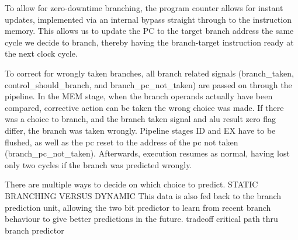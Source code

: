 To allow for zero-downtime branching, the program counter allows for instant updates, implemented via an internal bypass straight through to the instruction memory.
This allows us to update the PC to the target branch address the same cycle we decide to branch, thereby having the branch-target instruction ready at the next clock cycle.

To correct for wrongly taken branches, all branch related signals (branch\_taken, control\_should\_branch, and branch\_pc\_not\_taken) are passed on through the pipeline.
In the MEM stage, when the branch operands actually have been compared, corrective action can be taken the wrong choice was made. If there was a choice to branch, and the branch taken signal and alu result zero flag differ, the branch was taken wrongly.
Pipeline stages ID and EX have to be flushed, as well as the pc reset to the address of the pc not taken (branch\_pc\_not\_taken).
Afterwards, execution resumes as normal, having lost only two cycles if the branch was predicted wrongly.

There are multiple ways to decide on which choice to predict.
STATIC BRANCHING VERSUS DYNAMIC
This data is also fed back to the branch prediction unit, allowing the two bit predictor to learn from recent branch behaviour to give better predictions in the future.
tradeoff critical path thru branch predictor
